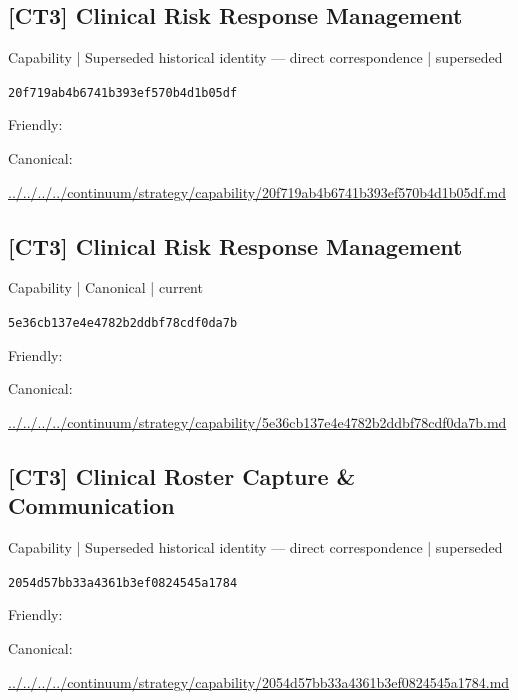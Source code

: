 \documentclass[10pt,a4paper]{article}
\begin{document}
\subsection*{[CT3] Clinical Risk Response Management}
{\small Capability | Superseded historical identity — direct correspondence | superseded}\par
\texttt{20f719ab4b6741b393ef570b4d1b05df}\par
Friendly: \par
Canonical: \par
{\footnotesize\url{../../../../continuum/strategy/capability/20f719ab4b6741b393ef570b4d1b05df.md}}\par
\subsection*{[CT3] Clinical Risk Response Management}
{\small Capability | Canonical | current}\par
\texttt{5e36cb137e4e4782b2ddbf78cdf0da7b}\par
Friendly: \par
Canonical: \par
{\footnotesize\url{../../../../continuum/strategy/capability/5e36cb137e4e4782b2ddbf78cdf0da7b.md}}\par
\subsection*{[CT3] Clinical Roster Capture \& Communication}
{\small Capability | Superseded historical identity — direct correspondence | superseded}\par
\texttt{2054d57bb33a4361b3ef0824545a1784}\par
Friendly: \par
Canonical: \par
{\footnotesize\url{../../../../continuum/strategy/capability/2054d57bb33a4361b3ef0824545a1784.md}}\par
\end{document}
